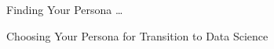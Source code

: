 \begin{frame}[fragile]\frametitle{}
	
	\begin{center}
	{\Large Finding Your Persona \ldots

	Choosing Your Persona for Transition to Data Science}  
	\end{center}

\end{frame}







			
  
  


